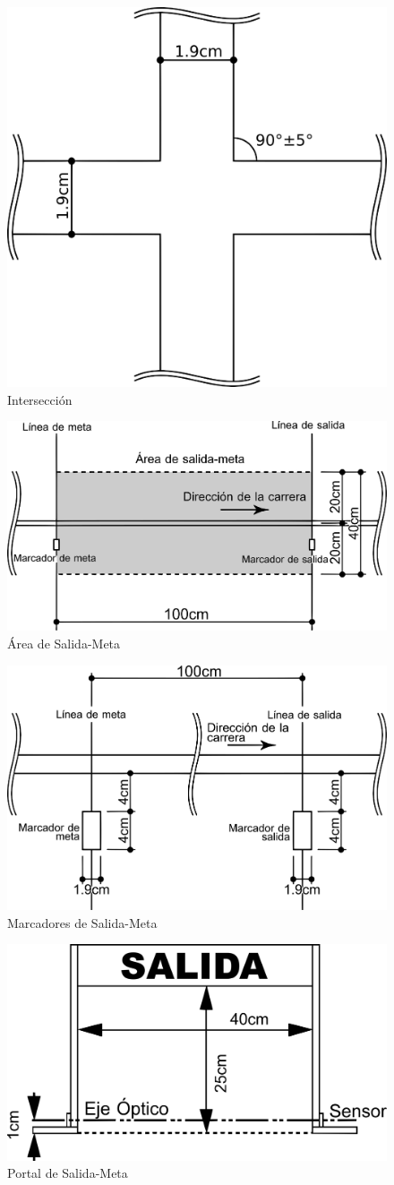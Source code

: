 \begin{figure}[H]
  \centering
  \includegraphics[width=0.6\linewidth]{./images/rules/figure3.png}
  \caption{Intersección}
\end{figure}

\begin{figure}[H]
  \centering
  \includegraphics[width=0.6\linewidth]{./images/rules/figure4.png}
  \caption{Área de Salida-Meta}
\end{figure}

\begin{figure}[H]
  \centering
  \includegraphics[width=0.6\linewidth]{./images/rules/figure5.png}
  \caption{Marcadores de Salida-Meta}
\end{figure}

\begin{figure}[H]
  \centering
  \includegraphics[width=0.6\linewidth]{./images/rules/figure6.png}
  \caption{Portal de Salida-Meta}
\end{figure}





